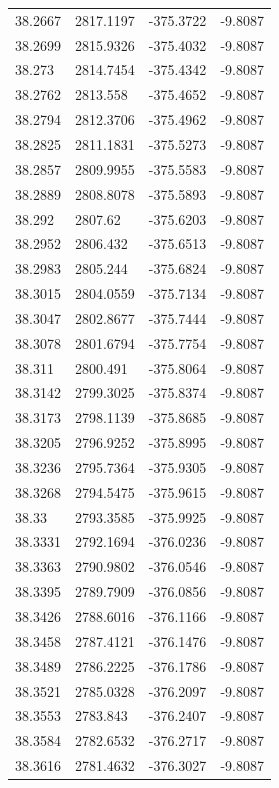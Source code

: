 \begin{table}[H]
\begin{tabular}{llll}
38.2667 & 2817.1197 & -375.3722 & -9.8087 \\
38.2699 & 2815.9326 & -375.4032 & -9.8087 \\
38.273 & 2814.7454 & -375.4342 & -9.8087 \\
38.2762 & 2813.558 & -375.4652 & -9.8087 \\
38.2794 & 2812.3706 & -375.4962 & -9.8087 \\
38.2825 & 2811.1831 & -375.5273 & -9.8087 \\
38.2857 & 2809.9955 & -375.5583 & -9.8087 \\
38.2889 & 2808.8078 & -375.5893 & -9.8087 \\
38.292 & 2807.62 & -375.6203 & -9.8087 \\
38.2952 & 2806.432 & -375.6513 & -9.8087 \\
38.2983 & 2805.244 & -375.6824 & -9.8087 \\
38.3015 & 2804.0559 & -375.7134 & -9.8087 \\
38.3047 & 2802.8677 & -375.7444 & -9.8087 \\
38.3078 & 2801.6794 & -375.7754 & -9.8087 \\
38.311 & 2800.491 & -375.8064 & -9.8087 \\
38.3142 & 2799.3025 & -375.8374 & -9.8087 \\
38.3173 & 2798.1139 & -375.8685 & -9.8087 \\
38.3205 & 2796.9252 & -375.8995 & -9.8087 \\
38.3236 & 2795.7364 & -375.9305 & -9.8087 \\
38.3268 & 2794.5475 & -375.9615 & -9.8087 \\
38.33 & 2793.3585 & -375.9925 & -9.8087 \\
38.3331 & 2792.1694 & -376.0236 & -9.8087 \\
38.3363 & 2790.9802 & -376.0546 & -9.8087 \\
38.3395 & 2789.7909 & -376.0856 & -9.8087 \\
38.3426 & 2788.6016 & -376.1166 & -9.8087 \\
38.3458 & 2787.4121 & -376.1476 & -9.8087 \\
38.3489 & 2786.2225 & -376.1786 & -9.8087 \\
38.3521 & 2785.0328 & -376.2097 & -9.8087 \\
38.3553 & 2783.843 & -376.2407 & -9.8087 \\
38.3584 & 2782.6532 & -376.2717 & -9.8087 \\
38.3616 & 2781.4632 & -376.3027 & -9.8087 \\

\end{tabular}
\end{table}
